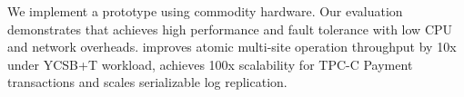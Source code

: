 



We implement a \sys prototype using commodity hardware. Our evaluation demonstrates that \sys achieves high performance and fault tolerance with low CPU and network overheads. \sys improves atomic multi-site operation throughput by 10x under YCSB+T workload, achieves 100x scalability for TPC-C Payment transactions and scales serializable log replication.